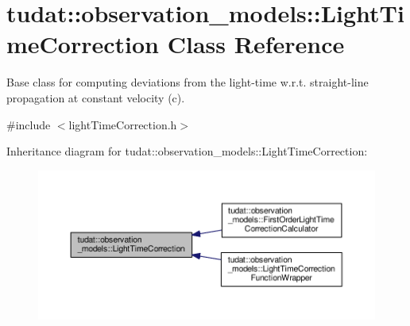 \hypertarget{classtudat_1_1observation__models_1_1LightTimeCorrection}{}\section{tudat\+:\+:observation\+\_\+models\+:\+:Light\+Time\+Correction Class Reference}
\label{classtudat_1_1observation__models_1_1LightTimeCorrection}


Base class for computing deviations from the light-\/time w.\+r.\+t. straight-\/line propagation at constant velocity (c).  




{\ttfamily \#include $<$light\+Time\+Correction.\+h$>$}



Inheritance diagram for tudat\+:\+:observation\+\_\+models\+:\+:Light\+Time\+Correction\+:
\nopagebreak
\begin{figure}[H]
\begin{center}
\leavevmode
\includegraphics[width=350pt]{classtudat_1_1observation__models_1_1LightTimeCorrection__inherit__graph}
\end{center}
\end{figure}

